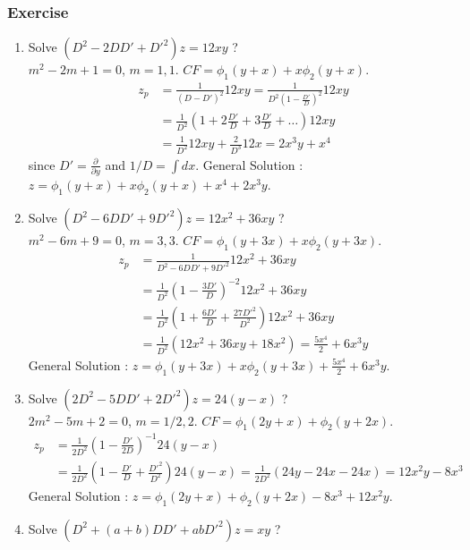 \subsubsection*{Exercise} %
\begin{enumerate}
\item Solve $(D^2 - 2DD' +D'^2)z = 12xy$ ?\\
	$m^2 -2m + 1 = 0$, $m = 1,1$.
	$CF = \phi_1(y+x) + x\phi_2(y+x)$.
	\begin{align*}
		z_p & = \frac{1}{(D-D')^2} 12xy = \frac{1}{D^2(1-\frac{D'}{D})^2} 12xy \\ 
		&= \frac{1}{D^2} (1+2\frac{D'}{D}+3\frac{D'}{D}+\dots) 12xy \\ 
		&= \frac{1}{D^2}12xy + \frac{2}{D^3} 12x 
		= 2x^3y + x^4
	\end{align*}
	since $D' = \frac{\partial }{\partial y}$ and 
		$1/D = \int dx$.
	General Solution : 
	$z = \phi_1(y+x) + x\phi_2(y+x) + x^4 + 2x^3y$.
\item Solve $(D^2- 6DD' + 9D'^2)z = 12x^2 + 36xy$ ?\\
	$m^2 - 6m + 9 = 0$, $m = 3,3$.
	$CF = \phi_1(y+3x) + x\phi_2(y+3x)$.\\
	\begin{align*}
		z_p & = \frac{1}{D^2 - 6DD' + 9D'^2} 12x^2+36xy\\
		& = \frac{1}{D^2}\left(1-\frac{3D'}{D}\right)^{-2} 12x^2 + 36xy\\
		& = \frac{1}{D^2} \left(1+\frac{6D'}{D} + \frac{27D'^2}{D^2}\right) 12x^2+36xy\\
		& = \frac{1}{D^2} \left( 12x^2 + 36xy + 18x^2 \right)
		= \frac{5x^4}{2} + 6x^3y 
	\end{align*}
	General Solution :
	$z = \phi_1(y+3x) + x\phi_2(y+3x) + \frac{5x^4}{2} + 6x^3y$.
\item Solve $(2D^2 - 5DD' + 2D'^2)z = 24(y-x)$ ?\\
	$2m^2 - 5m + 2 = 0$, $m = 1/2,2$.
	$CF = \phi_1(2y+x) + \phi_2(y+2x)$.\\
	\begin{align*}
		z_p & = \frac{1}{2D^2}\left(1 - \frac{D'}{2D}\right)^{-1} 24(y-x) \\
		& = \frac{1}{2D^2} (1 - \frac{D'}{D} + \frac{D'^2}{D^2}) 24(y-x)
		= \frac{1}{2D^2} (24y - 24x - 24x) 
		= 12x^2y - 8x^3
	\end{align*}
	General Solution :
	$z = \phi_1(2y+x) + \phi_2(y+2x) - 8x^3 + 12x^2y$.
\item Solve $(D^2 + (a+b)DD' + abD'^2)z = xy$ ?\\

\end{enumerate}
